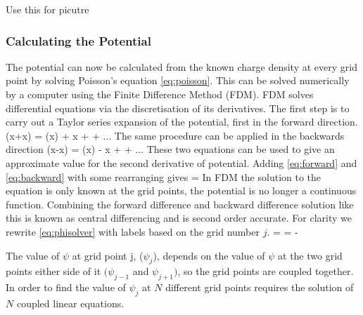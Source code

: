 Use this for picutre %
\subsubsection{Calculating the Potential}
The potential can now be calculated from the known charge density at every grid point by solving Poisson's equation \eqref{eq:poisson}. This can be solved numerically by a computer using the Finite Difference Method (FDM). FDM solves differential equations via the discretisation of its derivatives. The first step is to carry out a Taylor series expansion of the potential, first in the forward direction.
\be
\psi(x+\Delta x) = \psi(x) + \Delta x  +  + ...
\label{eq:forward}
\ee
The same procedure can be applied in the backwards direction 
\be
\psi(x-\Delta x) = \psi(x) - \Delta x  +  + ...
\label{eq:backward}
\ee
These two equations can be used to give an approximate value for the second derivative of potential. Adding \eqref{eq:forward} and \eqref{eq:backward} with some rearranging gives 
\be 
{} = 
\label{eq:phisolver}
\ee 
In FDM the solution to the equation is only known at the grid points, the potential is no longer a continuous function. Combining the forward difference and backward difference solution like this is known as central differencing and is second order accurate. For clarity we rewrite \eqref{eq:phisolver} with labels based on the grid number $j$. 
\be 
{} =  = -
\label{eq:phisolver1}
\ee 

The value of $\psi$ at grid point j, ($\psi_j$),  depends on the value of $\psi$ at the two grid points either side of it $(\psi_{j-1}$ and $\psi_{j+1})$, so the grid points are coupled together. In order to find the value of $\psi_j$ at $N$ different grid points requires the solution of $N$ coupled linear equations. 


